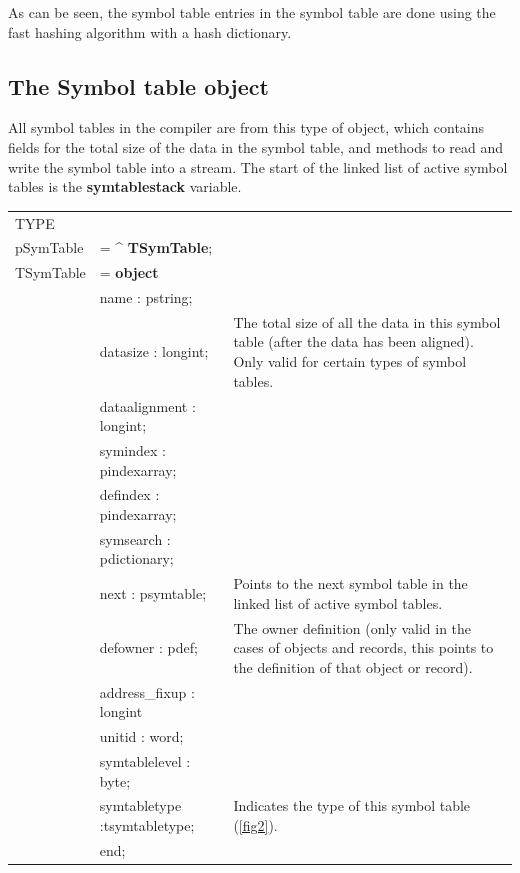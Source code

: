 \documentclass [12pt]{article}
\begin{document}
As can be seen, the symbol table entries in the symbol table are done using 
the fast hashing algorithm with a hash dictionary.

\subsection{The Symbol table object}
\label{subsec:mylabel3}

All symbol tables in the compiler are from this type of object, which 
contains fields for the total size of the data in the symbol table, and 
methods to read and write the symbol table into a stream. The start of the 
linked list of active symbol tables is the \textbf{symtablestack} variable.

\begin{tabular*}{6.5in}{|l@{\extracolsep{\fill}}lp{}|}
\hline
\textsf{TYPE} & & \\
\xspace \textsf{pSymTable} &= \^{} \textbf{TSymTable};&  \\
\xspace \textsf{TSymTable} &= \textbf{object} & \\
& \textsf{name : pstring;}& \\
& \textsf{datasize : longint;}& 
	The total size of all the data in this symbol table (after the data has been aligned). Only valid for certain types of symbol tables. \\
& \textsf{dataalignment : longint;}& \\ 
& \textsf{symindex : pindexarray;}& \\
& \textsf{defindex : pindexarray;}&  \\
& \textsf{symsearch : pdictionary;}& \\
& \textsf{next : psymtable;}& 
	Points to the next symbol table in the linked list of active symbol tables. \\
& \textsf{defowner : pdef;}& 
	The owner definition (only valid in the cases of objects and records, this points to the definition of that object or record). \\
& \textsf{address{\_}fixup : longint}&  \\
& \textsf{unitid : word;}&  \\
& \textsf{symtablelevel : byte;}&  \\
& \textsf{symtabletype :tsymtabletype;}& 
	Indicates the type of this symbol table (\ref{fig2}). \\
&\textsf{end;}&  \\
\hline
\end{tabular*}
\end{document}
